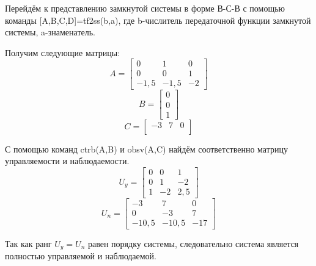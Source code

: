 \documentclass[12pt,a4paper]{article}
\begin{document}
Перейдём к представлению замкнутой системы в форме В-С-В с помощью команды [A,B,C,D]=tf2ss(b,a), где b-числитель передаточной функции замкнутой системы, a-знаменатель.\par
Получим следующие матрицы:
\begin{equation*}
A =\begin{bmatrix}
    0       &   1   &   0 \\
    0       &   0   &	1 \\
    -1,5    & -1,5  &   -2
\end{bmatrix}
\end{equation*}
\begin{equation*}
B =\begin{bmatrix}
    0  \\
	0  \\
	1
\end{bmatrix}
\end{equation*}
\begin{equation*}
C =\begin{bmatrix}
    -3 & 7  & 0 \\
\end{bmatrix}
\end{equation*}

С помощью команд ctrb(A,B) и obsv(A,C) найдём соответственно матрицу управляемости и наблюдаемости.
\begin{equation*}
U_y =\begin{bmatrix}
    0   &   0   &   1 \\
    0   &   1   &	-2 \\
    1   &   -2  &   2,5
\end{bmatrix}
\end{equation*}
\begin{equation*}
U_n =\begin{bmatrix}
    -3      &   7       &   0 \\
    0       &   -3      &	7 \\
    -10,5   &   -10,5   &   -17
\end{bmatrix}
\end{equation*}\par
Так как ранг $U_y=U_n$ равен порядку системы, следовательно система является полностью управляемой и наблюдаемой.

\newpage
\end{document}
